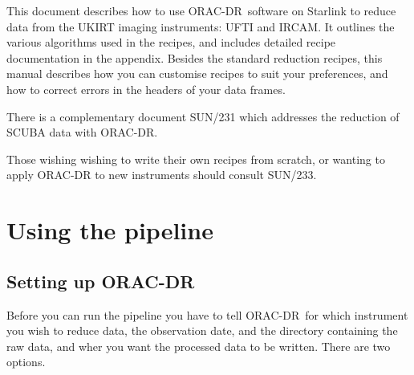 \documentclass[twoside,11pt]{article}
\newcommand{\xref}[3]{#1}
\newcommand{\xlabel}[1]{}
\renewcommand{\_}{\texttt{\symbol{95}}}
\newcommand{\ORACDR}{{\footnotesize ORAC-DR}}
\begin{document}
This document describes how to use \ORACDR\ software on Starlink to
reduce data from the UKIRT imaging instruments: UFTI and IRCAM. It
outlines the various algorithms used in the recipes, and includes
detailed recipe documentation in the appendix.  Besides the standard
reduction recipes, this manual describes how you can customise recipes
to suit your preferences, and how to correct errors in the headers of
your data frames.

There is a complementary document \xref{SUN/231}{sun231}{} which
addresses the reduction of SCUBA data with \ORACDR.



Those wishing wishing to write their own recipes from scratch, or wanting
to apply ORAC-DR to new instruments should consult \xref{SUN/233}{sun233}{}.

\section{\xlabel{using_the_pipeline}Using the pipeline\label{using_the_pipeline}}

\subsection{\xlabel{setting_up_orac-dr}Setting up \ORACDR\label{setting_up_orac-dr}}

Before you can run the pipeline you have to tell \ORACDR\ for which
instrument you wish to reduce data, the observation date, and the
directory containing the raw data, and wher you want the processed
data to be written.  There are two options.
\end{document}
